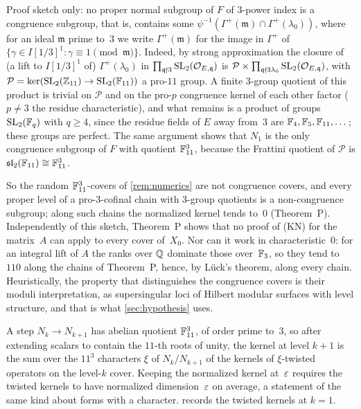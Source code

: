 \begin{remark}\label{rem:congruence}
Proof sketch only: no proper normal subgroup of $F$ of $3$-power index is a congruence subgroup, that is, contains some
$\psi^{-1}(\Gamma^+(\mathfrak m)\cap\Gamma^+(\lambda_0))$, where for an ideal $\mathfrak m$ prime to~$3$ we write $\Gamma^+(\mathfrak m)$
for the image in $\Gamma^+$ of $\{\gamma\in I[1/3]^1:\gamma\equiv1\pmod{\mathfrak m}\}$. Indeed, by strong approximation
the closure of (a lift to $I[1/3]^1$ of) $\Gamma^+(\lambda_0)$ in $\prod_{\mathfrak q\nmid3}\operatorname{SL}_2(\mathcal{O}_{E,\mathfrak q})$ is
$\mathcal P\times\prod_{\mathfrak q\nmid3\lambda_0}\operatorname{SL}_2(\mathcal{O}_{E,\mathfrak q})$, with
$\mathcal P=\ker(\operatorname{SL}_2(\mathbb{Z}_{11})\to\operatorname{SL}_2(\mathbb{F}_{11}))$ a pro-$11$ group. A finite $3$-group quotient of this product
is trivial on $\mathcal P$ and on the pro-$p$ congruence kernel of each other factor ($p\ne3$ the residue
characteristic), and what remains is a product of groups $\operatorname{SL}_2(\mathbb{F}_q)$ with $q\ge4$, since the residue fields of $E$ away
from~$3$ are $\mathbb{F}_4,\mathbb{F}_5,\mathbb{F}_{11},\dots$; these groups are perfect. The same argument shows that $N_1$ is the only congruence
subgroup of $F$ with quotient $\mathbb{F}_{11}^3$, because the Frattini quotient of $\mathcal P$ is
$\mathfrak{sl}_2(\mathbb{F}_{11})\cong\mathbb{F}_{11}^3$.

So the random $\mathbb{F}_{11}^3$-covers of \cref{rem:numerics} are not congruence covers, and every proper level of a
pro-$3$-cofinal chain with $3$-group quotients is a non-congruence subgroup; along such chains the normalized kernel tends
to~$0$ (Theorem~P). Independently of this sketch, Theorem~P shows that no proof of (KN) for the matrix~$A$ can apply to
every cover of~$X_0$. Nor can it work in characteristic~$0$: for an integral lift of $A$ the ranks over $\mathbb{Q}$ dominate
those over~$\mathbb{F}_3$, so they tend to $110$ along the chains of Theorem~P, hence, by L\"uck's theorem, along every chain.
Heuristically, the property that distinguishes the congruence covers is their moduli interpretation, as supersingular
loci of Hilbert modular surfaces with level structure, and that is what \cref{sec:hypothesis} uses.
\end{remark}

\begin{remark}\label{rem:twists}
A step $N_k\to N_{k+1}$ has abelian quotient $\mathbb{F}_{11}^3$, of order prime to~$3$, so after extending scalars to contain the
$11$-th roots of unity, the kernel at level $k+1$ is the sum over the $11^3$ characters $\xi$ of $N_k/N_{k+1}$ of the kernels
of $\xi$-twisted operators on the level-$k$ cover. Keeping the normalized kernel at~$\varepsilon$ requires the twisted kernels to
have normalized dimension~$\varepsilon$ on average, a statement of the same kind about forms with a character.
 records the twisted kernels at $k=1$.
\end{remark}

